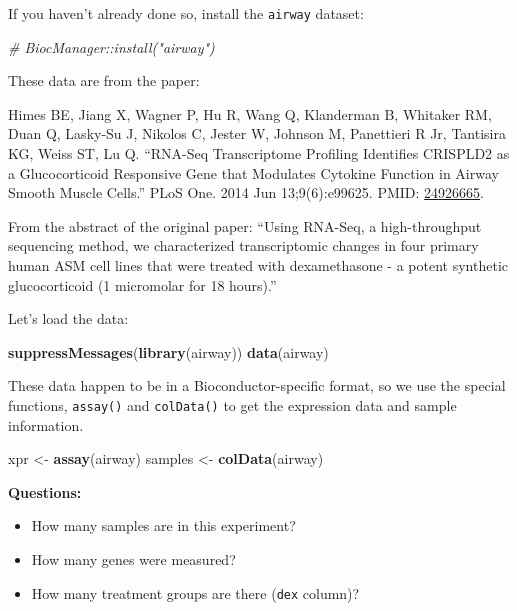 \documentclass[
]{book}
\newenvironment{Shaded}{\begin{snugshade}}{\end{snugshade}}
\newcommand{\CommentTok}[1]{\textcolor[rgb]{0.56,0.35,0.01}{\textit{#1}}}
\newcommand{\FunctionTok}[1]{\textcolor[rgb]{0.13,0.29,0.53}{\textbf{#1}}}
\newcommand{\NormalTok}[1]{#1}
\newcommand{\OtherTok}[1]{\textcolor[rgb]{0.56,0.35,0.01}{#1}}
\providecommand{\tightlist}{%
  \setlength{\itemsep}{0pt}\setlength{\parskip}{0pt}}
\begin{document}
If you haven't already done so, install the \texttt{airway} dataset:

\begin{Shaded}
\begin{Highlighting}[]
\CommentTok{\# BiocManager::install("airway") }
\end{Highlighting}
\end{Shaded}

These data are from the paper:

Himes BE, Jiang X, Wagner P, Hu R, Wang Q, Klanderman B, Whitaker RM, Duan Q, Lasky-Su J, Nikolos C, Jester W, Johnson M, Panettieri R Jr, Tantisira KG, Weiss ST, Lu Q. ``RNA-Seq Transcriptome Profiling Identifies CRISPLD2 as a Glucocorticoid Responsive Gene that Modulates Cytokine Function in Airway Smooth Muscle Cells.'' PLoS One. 2014 Jun 13;9(6):e99625. PMID: \href{https://pubmed.ncbi.nlm.nih.gov/24926665/}{24926665}.

From the abstract of the original paper: ``Using RNA-Seq, a high-throughput sequencing method, we characterized transcriptomic changes in four primary human ASM cell lines that were treated with dexamethasone - a potent synthetic glucocorticoid (1 micromolar for 18 hours).''

Let's load the data:

\begin{Shaded}
\begin{Highlighting}[]
\FunctionTok{suppressMessages}\NormalTok{(}\FunctionTok{library}\NormalTok{(airway))}
\FunctionTok{data}\NormalTok{(airway)}
\end{Highlighting}
\end{Shaded}

These data happen to be in a Bioconductor-specific format, so we use the special functions, \texttt{assay()} and \texttt{colData()} to get the expression data and sample information.

\begin{Shaded}
\begin{Highlighting}[]
\NormalTok{xpr }\OtherTok{\textless{}{-}} \FunctionTok{assay}\NormalTok{(airway)}
\NormalTok{samples }\OtherTok{\textless{}{-}} \FunctionTok{colData}\NormalTok{(airway)}
\end{Highlighting}
\end{Shaded}

\textbf{Questions:}

\begin{itemize}
\tightlist
\item
  How many samples are in this experiment?
\item
  How many genes were measured?
\item
  How many treatment groups are there (\texttt{dex} column)?
\end{itemize}
\end{document}
